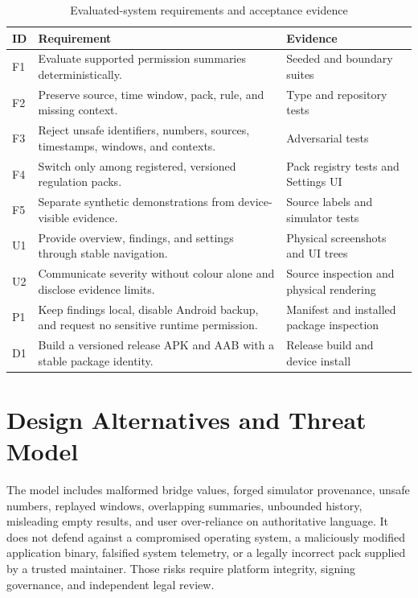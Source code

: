 \begin{table}[H]
\centering
\small
\caption{Evaluated-system requirements and acceptance evidence}
\label{tab:r11-requirements}
\begin{tabular}{p{}p{}p{}}
\toprule
ID & Requirement & Evidence \\
\midrule
F1 & Evaluate supported permission summaries deterministically. & Seeded and boundary suites \\
F2 & Preserve source, time window, pack, rule, and missing context. & Type and repository tests \\
F3 & Reject unsafe identifiers, numbers, sources, timestamps, windows, and contexts. & Adversarial tests \\
F4 & Switch only among registered, versioned regulation packs. & Pack registry tests and Settings UI \\
F5 & Separate synthetic demonstrations from device-visible evidence. & Source labels and simulator tests \\
U1 & Provide overview, findings, and settings through stable navigation. & Physical screenshots and UI trees \\
U2 & Communicate severity without colour alone and disclose evidence limits. & Source inspection and physical rendering \\
P1 & Keep findings local, disable Android backup, and request no sensitive runtime permission. & Manifest and installed package inspection \\
D1 & Build a versioned release APK and AAB with a stable package identity. & Release build and device install \\
\bottomrule
\end{tabular}
\end{table}

\section{Design Alternatives and Threat Model}

The model includes malformed bridge values, forged simulator provenance, unsafe numbers, replayed windows, overlapping summaries, unbounded history, misleading empty results, and user over-reliance on authoritative language. It does not defend against a compromised operating system, a maliciously modified application binary, falsified system telemetry, or a legally incorrect pack supplied by a trusted maintainer. Those risks require platform integrity, signing governance, and independent legal review.

